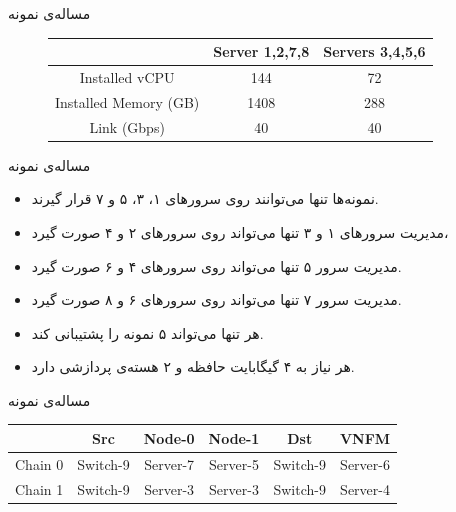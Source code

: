 \documentclass{beamer}
\makeatletter
\newcommand{\RTList}{\raggedleft\rightskip\@totalleftmargin}
\makeatother
\begin{document}
\begin{persian}
\begin{frame}{مساله‌ی نمونه}
\begin{figure}[h!]
\begin{center}
\begin{latin}
\begin{tabular}{|c|c|c|}
            \hline
            & Server 1,2,7,8 & Servers 3,4,5,6 \\
            \hline
            Installed vCPU & 144 & 72 \\
            \hline
            Installed Memory (GB) & 1408 & 288 \\
            \hline
            Link (Gbps) & 40 & 40 \\
            \hline
        \end{tabular}\end{latin}\end{center}
    \end{figure}
\end{frame}
\begin{frame}{مساله‌ی نمونه}
    \begin{itemize}\RTList{}
        \justifying
        \item نمونه‌ها تنها می‌توانند روی سرورهای ۱، ۳، ۵ و ۷ قرار گیرند.
        \item مدیریت سرورهای ۱ و ۳ تنها می‌تواند روی سرورهای ۲ و ۴  صورت گیرد،
        \item مدیریت سرور ۵ تنها می‌تواند روی سرورهای ۴ و ۶ صورت گیرد.
        \item مدیریت سرور ۷ تنها می‌تواند روی سرورهای ۶ و ۸ صورت گیرد.
        \item هر  تنها می‌تواند ۵ نمونه را پشتیبانی کند.
        \item هر  نیاز به ۴ گیگابایت حافظه و ۲ هسته‌ی پردازشی دارد.
    \end{itemize}
\end{frame}
\begin{frame}{مساله‌ی نمونه}
    \begin{table}[h!]
        \begin{center}\begin{latin}\begin{tabular}{|c|c|c|c|c|c|}
            \hline
            & Src & Node-0 & Node-1 & Dst & VNFM \\
            \hline
            Chain 0 & Switch-9 & Server-7 & Server-5 & Switch-9 & Server-6 \\
            \hline
            Chain 1 & Switch-9 & Server-3 & Server-3 & Switch-9 & Server-4 \\
            \hline
        \end{tabular}\end{latin}\end{center}

\end{table}
\end{frame}
\end{persian}
\end{document}
